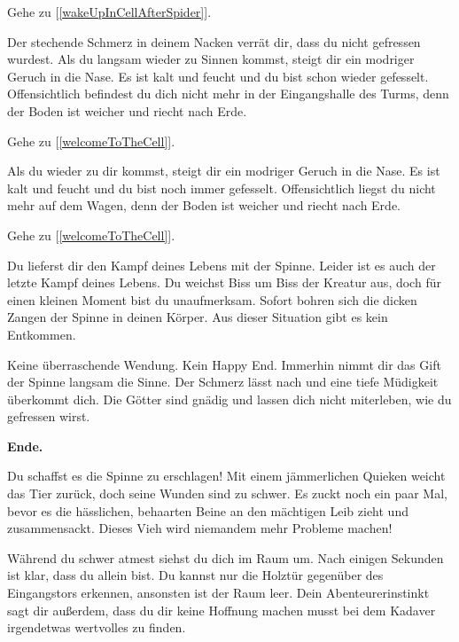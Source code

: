 Gehe zu [\ref{wakeUpInCellAfterSpider}].


Der stechende Schmerz in deinem Nacken verrät dir, dass du nicht gefressen wurdest. Als du langsam wieder zu Sinnen kommst, steigt dir ein modriger Geruch in die Nase. Es ist kalt und feucht und du bist schon wieder gefesselt. Offensichtlich befindest du dich nicht mehr in der Eingangshalle des Turms, denn der Boden ist weicher und riecht nach Erde.

Gehe zu [\ref{welcomeToTheCell}].


Als du wieder zu dir kommst, steigt dir ein modriger Geruch in die Nase. Es ist kalt und feucht und du bist noch immer gefesselt. Offensichtlich liegst du nicht mehr auf dem Wagen, denn der Boden ist weicher und riecht nach Erde.

Gehe zu [\ref{welcomeToTheCell}].


Du lieferst dir den Kampf deines Lebens mit der Spinne. Leider ist es auch der letzte Kampf deines Lebens. Du weichst Biss um Biss der Kreatur aus, doch für einen kleinen Moment bist du unaufmerksam. Sofort bohren sich die dicken Zangen der Spinne in deinen Körper. Aus dieser Situation gibt es kein Entkommen.

Keine überraschende Wendung. Kein Happy End. Immerhin nimmt dir das Gift der Spinne langsam die Sinne. Der Schmerz lässt nach und eine tiefe Müdigkeit überkommt dich. Die Götter sind gnädig und lassen dich nicht miterleben, wie du gefressen wirst.

\textbf{Ende.}


Du schaffst es die Spinne zu erschlagen! Mit einem jämmerlichen Quieken weicht das Tier zurück, doch seine Wunden sind zu schwer. Es zuckt noch ein paar Mal, bevor es die hässlichen, behaarten Beine an den mächtigen Leib zieht und zusammensackt. Dieses Vieh wird niemandem mehr Probleme machen!

Während du schwer atmest siehst du dich im Raum um. Nach einigen Sekunden ist klar, dass du allein bist. Du kannst nur die Holztür gegenüber des Eingangstors erkennen, ansonsten ist der Raum leer. Dein Abenteurerinstinkt sagt dir außerdem, dass du dir keine Hoffnung machen musst bei dem Kadaver irgendetwas wertvolles zu finden.

